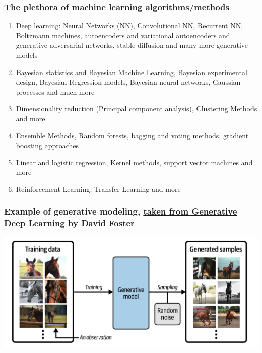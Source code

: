 \documentclass{beamer}
\begin{document}
\begin{frame}
\frametitle{The plethora  of machine learning algorithms/methods}

\begin{enumerate}
\item Deep learning: Neural Networks (NN), Convolutional NN, Recurrent NN, Boltzmann machines, autoencoders and variational autoencoders  and generative adversarial networks, stable diffusion and many more generative models

\item Bayesian statistics and Bayesian Machine Learning, Bayesian experimental design, Bayesian Regression models, Bayesian neural networks, Gaussian processes and much more

\item Dimensionality reduction (Principal component analysis), Clustering Methods and more

\item Ensemble Methods, Random forests, bagging and voting methods, gradient boosting approaches 

\item Linear and logistic regression, Kernel methods, support vector machines and more

\item Reinforcement Learning; Transfer Learning and more 
\end{enumerate}

\noindent
\end{frame}

\begin{frame}
\frametitle{Example of generative modeling, \href{{https://www.oreilly.com/library/view/generative-deep-learning/9781098134174/ch01.html}}{taken from Generative Deep Learning by David Foster}}

\vspace{6mm}

\centerline{\includegraphics[width=1.0\linewidth]{figures/generativelearning.png}}

\vspace{6mm}
\end{frame}
\end{document}
